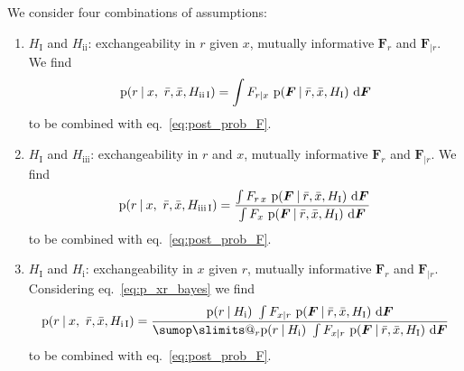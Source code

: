 \documentclass[\ifafour a4paper,12pt,\else a5paper,10pt,\fi%
onecolumn,oneside,article,%
british%
]{memoir}
\makeatletter
\theoremstyle{remark}
\theoremstyle{innote}
\def\sum{\DOTSI\sumop\slimits@}
\def\prod{\DOTSI\prodop\slimits@}
\newcommand*{\di}{\mathrm{d}}%
\newcommand*{\p}{\mathrm{p}}%
\renewcommand*{\|}[1][]{\nonscript\:#1\vert\nonscript\:\mathopen{}}
\renewcommand*{\=}{\TextOrMath\texteq\eq}
\newcommand*{\eqn}{eq.}%
\newcommand*{\eqns}{eqs}%
\newcommand*{\q}{}%
\DeclareRobustCommand*{\q}{%
  \mathord{\mathpalette\bigcdot@{}}%
}
\newcommand*{\bigcdot@scalefactor}{0.7}
\newcommand*{\bigcdot@widthfactor}{1.5}
\newcommand*{\bigcdot@}[2]{%
  \sbox0{$#1\vcenter{}$}%
  \sbox2{$#1\cdot\m@th$}%
  \hbox to \bigcdot@widthfactor\wd2{%
    \hfil
    \raise\ht0\hbox{%
      \scalebox{\bigcdot@scalefactor}{%
        \lower\ht0\hbox{$#1\bullet\m@th$}%
      }%
    }%
    \hfil
  }%
}
\newcommand*{\ro}{r}
\newcommand*{\xo}{x}
\newcommand*{\rd}{\bar{r}}
\newcommand*{\xd}{\bar{x}}
\newcommand*{\yF}{\bm{F}}
\newcommand*{\yFr}{\yF_{\bm{\mid}r}}
\makeatother
\begin{document}
We consider four combinations of assumptions:
\begin{enumerate}[label=\arabic*.]
\item\label{item:I_ii} $H_{\textrm{I}}$ and $H_{\textrm{ii}}$:
  exchangeability in $r$ given $x$, mutually informative $\yF_{r\q}$ and
  $\yFr$.
  We find
  \begin{equation}
    \label{eq:post_rx_simple}
    \p(\ro \| \xo,\ \rd,\xd, H_{\textrm{ii\,I}}) 
=  \int F_{\ro\mid\xo}\ \p(\yF\| \rd,\xd, H_{\textrm{I}})\ \di\yF
\end{equation}
to be combined with \eqn~\eqref{eq:post_prob_F}.
  
\item\label{item:I_iii} $H_{\textrm{I}}$ and $H_{\textrm{iii}}$:
  exchangeability in $r$ and $x$, mutually informative $\yF_{r\q}$ and
  $\yFr$. %
  We find
  \begin{equation}
    \label{eq:post_rx_updated}
        \p(\ro \| \xo,\ \rd,\xd, H_{\textrm{iii\,I}}) 
        =
        \frac{\int F_{\ro\,\xo}\ \p(\yF\| \rd,\xd, H_{\textrm{I}})\
          \di\yF}{
          \int F_{\q\xo}\ \p(\yF\| \rd,\xd, H_{\textrm{I}})\
          \di\yF
        }
  \end{equation}
  to be combined with \eqn~\eqref{eq:post_prob_F}.

\item\label{item:I_i} $H_{\textrm{I}}$ and $H_{\textrm{i}}$:
  exchangeability in $x$ given $r$, mutually informative $\yF_{r\q}$ and
  $\yFr$. Considering \eqn~\eqref{eq:p_xr_bayes} we find
  \begin{equation}
    \label{eq:post_xr_unfactorized}
    \p(\ro \| \xo,\ \rd,\xd, H_{\textrm{i\,I}}) = \frac{
    \p(\ro\|  H_{\textrm{i}})\ \int F_{\xo\mid\ro}\ \p(\yF\| \rd,\xd,
    H_{\textrm{I}})\ \di\yF
  }{
    \sum_{r}\p(r\|  H_{\textrm{i}})\ \int F_{\xo\mid r}\ \p(\yF\| \rd,\xd,
    H_{\textrm{I}})\ \di\yF
    }
\end{equation}
to be combined with \eqn~\eqref{eq:post_prob_F}.
  

\end{enumerate}
\end{document}
